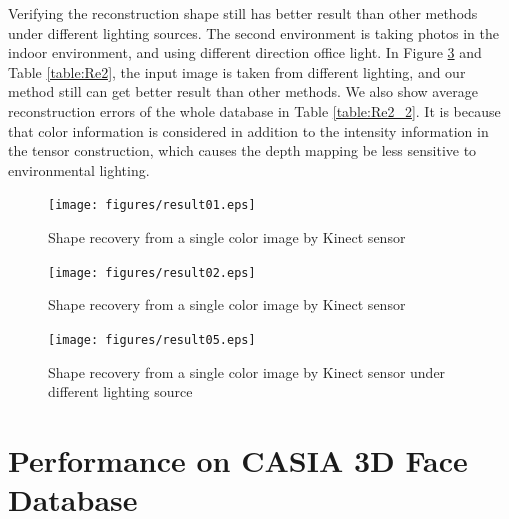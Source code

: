 Verifying the reconstruction shape still has better result than other methods under different lighting sources. 
The second environment is taking photos in the indoor environment, and using different direction office light. 
In Figure \ref{fig:result05} and Table \ref{table:Re2}, the input image is taken from different lighting, and our method still can get better result than other methods.
We also show average reconstruction errors of the whole database in Table \ref{table:Re2_2}. 
It is because that color information is considered in addition to the intensity information in the tensor construction, which causes the depth mapping be less sensitive to environmental lighting.  
 



\begin{figure}
\begin{center}

  \texttt{[image: figures/result01.eps]}
  \caption{Shape recovery from a single color image by Kinect sensor}
  \label{fig:result01}

\end{center}
\end{figure}


\begin{figure}
\begin{center}

  \texttt{[image: figures/result02.eps]}
  \caption{Shape recovery from a single color image by Kinect sensor}
  \label{fig:result02}

\end{center}
\end{figure}


\begin{figure}
\begin{center}

  \texttt{[image: figures/result05.eps]}
  \caption{Shape recovery from a single color image by Kinect sensor under different lighting source}
  \label{fig:result05}

\end{center}
\end{figure}
 
\section{Performance on CASIA 3D Face Database}

